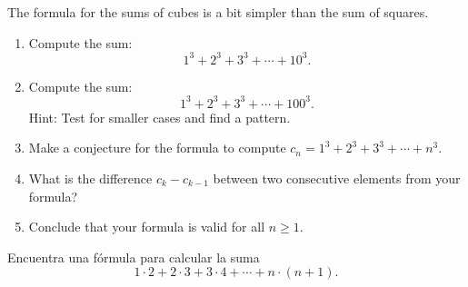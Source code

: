 The formula for the sums of cubes is a bit simpler than the sum of squares.
\begin{exercise}
\begin{enumerate}
    \item Compute the sum: $$1^3+2^3+3^3+\cdots+10^3.$$
    \item Compute the sum: $$1^3+2^3+3^3+\cdots+100^3.$$ Hint: Test for smaller cases and find a pattern.
    \item Make a conjecture for the formula to compute $c_n = 1^3+2^3+3^3+\cdots+n^3$. 
    \item What is the difference $c_k-c_{k-1}$ between two consecutive elements from your formula?
    \item Conclude that your formula is valid for all $n\geq 1$.
\end{enumerate}
\end{exercise}
\tutpagebreak

\begin{exercise}
Encuentra una fórmula para calcular la suma $$1\cdot2+2\cdot3+3\cdot4+\cdots+n\cdot(n+1).$$
\end{exercise}
\tutpagebreak

